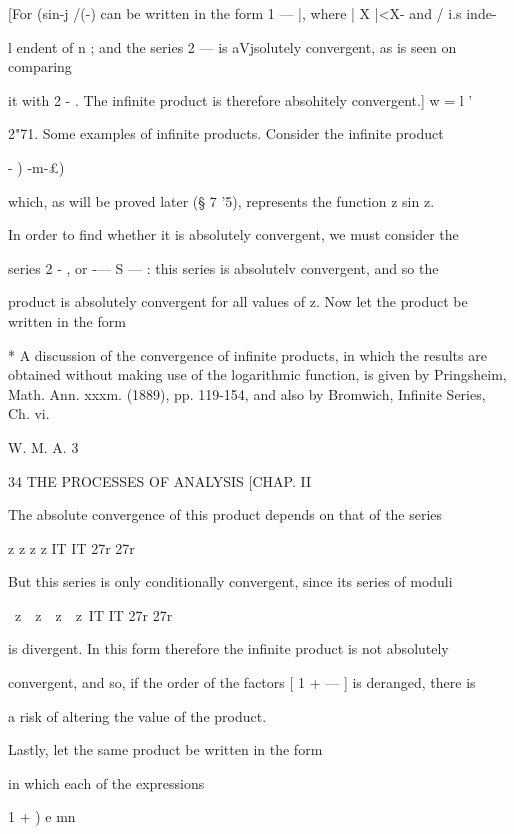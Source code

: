 [For (sin-j /(-) can be written in the form 1 — |, where | X  |<X- and /  i.s inde- 

l endent of n ; and the series 2 —   is aVjsolutely convergent, as is seen on comparing 

it with 2 - . The infinite product is therefore absohitely convergent.] 
w = l '  

2"71. Some examples of infinite products. 
Consider the infinite product 



  - )  -m-£) 



which, as will be proved later (§ 7 '5), represents the function z   sin z. 

In order to find whether it is absolutely convergent, we must consider the 

series 2 - , or -— S — : this series is absolutelv convergent, and so the 

product is absolutely convergent for all values of z. 
Now let the product be written in the form 

* A discussion of the convergence of infinite products, in which the results are obtained 
without making use of the logarithmic function, is given by Pringsheim, Math. Ann. xxxm. 
(1889), pp. 119-154, and also by Bromwich, Infinite Series, Ch. vi. 

W. M. A. 3 



34 THE PROCESSES OF ANALYSIS [CHAP. II 

The absolute convergence of this product depends on that of the series 



z z z z 
IT IT 27r 27r 



But this series is only conditionally convergent, since its series of moduli 

\ z\ \ z\ \ z\ \ z\ 
IT IT 27r 27r 

is divergent. In this form therefore the infinite product is not absolutely 

convergent, and so, if the order of the factors [ 1 + — ] is deranged, there is 

a risk of altering the value of the product. 

Lastly, let the same product be written in the form 

in which each of the expressions 



1 + ) e mn 

